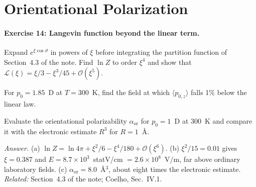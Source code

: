 \documentclass[11pt]{article}      %
\numberwithin{equation}{section}   %
\begin{document}
\section{Orientational Polarization}

\paragraph{Exercise 14: Langevin function beyond the linear term.}
\begin{parts}
    \item Expand $e^{\xi\cos\vartheta}$ in powers of $\xi$ before integrating the partition function of Section~4.3 of the note. Find $\ln Z$ to order $\xi^4$ and show that $\mathcal{L}(\xi) = \xi/3 - \xi^3/45 + \mathcal{O}(\xi^5)$.
    \item For $p_0 = 1.85$~D at $T = 300$~K, find the field at which $\langle p_{0,z}\rangle$ falls 1\% below the linear law.
    \item Evaluate the orientational polarizability $\alpha_{\text{or}}$ for $p_0 = 1$~D at 300~K and compare it with the electronic estimate $R^3$ for $R = 1$~\AA.
\end{parts}
\textit{Answer.} (a) $\ln Z = \ln 4\pi + \xi^2/6 - \xi^4/180 + \mathcal{O}(\xi^6)$. (b) $\xi^2/15 = 0.01$ gives $\xi = 0.387$ and $E = 8.7\times10^3$~statV/cm $= 2.6\times10^8$~V/m, far above ordinary laboratory fields. (c) $\alpha_{\text{or}} = 8.0$~\AA$^3$, about eight times the electronic estimate.\\
\textit{Related:} Section~4.3 of the note; Coelho, Sec.~IV.1.
\end{document}
